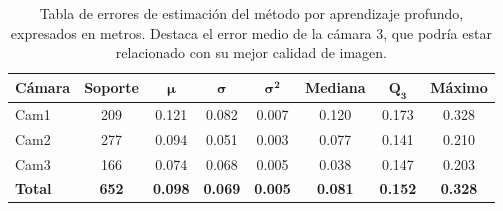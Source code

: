 \begin{table}[!ht]
  \centering
  \scriptsize
\begin{tabular}{|l|c|c|c|c|c|c|c|}
\hline
\rowcolor[HTML]{FFCB2F}
\textbf{Cámara} & \textbf{Soporte} & $\bm{\mu}$ & $\bm{\sigma}$ & $\bm{\sigma^2}$ & \textbf{Mediana} & $\bm{Q_3}$ & \textbf{Máximo} \\
\hline
Cam1 & 209 & 0.121 & 0.082 & 0.007 &0.120 & 0.173 & 0.328 \\
\hline
Cam2 & 277 & 0.094 & 0.051 & 0.003 &0.077 & 0.141 & 0.210 \\
\hline
Cam3 & 166 & 0.074 & 0.068 & 0.005 &0.038 & 0.147 & 0.203 \\
\hline
\textbf{Total} & \textbf{652} & \textbf{0.098} & \textbf{0.069} & \textbf{0.005} & \textbf{0.081} & \textbf{0.152} & \textbf{0.328} \\
\hline
\end{tabular}
\caption[Tabla de errores de estimación del método por aprendizaje profundo, expresados en metros.]{
  Tabla de errores de estimación del método por aprendizaje profundo, expresados en metros.
  Destaca el error medio de la cámara 3, que podría estar relacionado con su mejor calidad de imagen.}
\label{tab:AutoResults}
\end{table}


